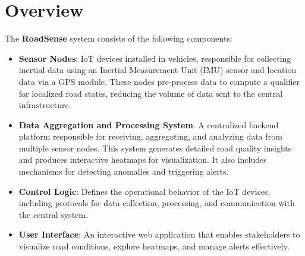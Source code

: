 \section{Overview}

The \textbf{RoadSense} system consists of the following components:
\begin{itemize}
    \item \textbf{Sensor Nodes}: IoT devices installed in vehicles, responsible for collecting inertial data using an Inertial Measurement Unit (IMU) sensor and location data via a GPS module. These nodes pre-process data to compute a qualifier for localized road states, reducing the volume of data sent to the central infrastructure.
    \item \textbf{Data Aggregation and Processing System}: A centralized backend platform responsible for receiving, aggregating, and analyzing data from multiple sensor nodes. This system generates detailed road quality insights and produces interactive heatmaps for visualization. It also includes mechanisms for detecting anomalies and triggering alerts.
    \item \textbf{Control Logic}: Defines the operational behavior of the IoT devices, including protocols for data collection, processing, and communication with the central system.
    \item \textbf{User Interface}: An interactive web application that enables stakeholders to visualize road conditions, explore heatmaps, and manage alerts effectively.
\end{itemize}
